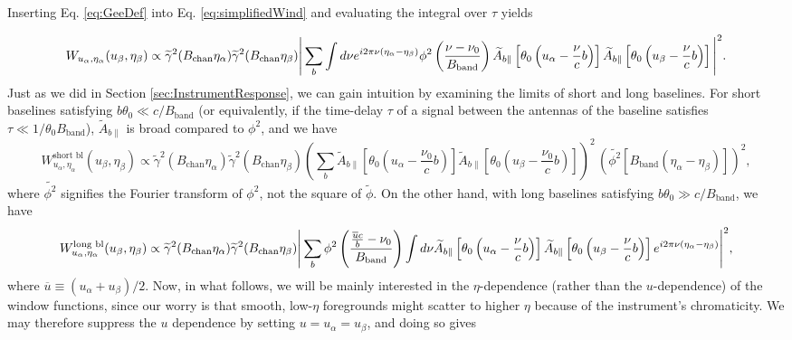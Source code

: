 \documentclass[twocolumn,aps,prd,nofootinbib,showpacs]{revtex4-1}
\begin{document}
Inserting  Eq. \eqref{eq:GeeDef} into  Eq. \eqref{eq:simplifiedWind} and evaluating the integral over $\tau$ yields
\begin{widetext}
\begin{equation}
W_{u_\alpha,\eta_\alpha} (u_\beta,\eta_\beta) \propto \widetilde{\gamma}^2(B_\textrm{chan} \eta_\alpha)\widetilde{\gamma}^2(B_\textrm{chan} \eta_\beta) \Bigg{|} \sum_b \int d\nu e^{i 2 \pi \nu (\eta_\alpha - \eta_\beta)} \phi^2 \left( \frac{\nu-\nu_0}{B_\textrm{band}}\right)  \widetilde{A}_{b\parallel} \left[ \theta_0 \left( u_\alpha - \frac{\nu}{c} b \right) \right]  \widetilde{A}_{b\parallel} \left[ \theta_0 \left( u_\beta - \frac{\nu}{c} b \right) \right] \Bigg{|}^2.
\end{equation}
Just as we did in Section \ref{sec:InstrumentResponse}, we can gain intuition by examining the limits of short and long baselines.  For short baselines satisfying $b \theta_0 \ll c / B_\textrm{band}$ (or equivalently, if the time-delay $\tau$ of a signal between the antennas of the baseline satisfies $\tau \ll 1/ \theta_0 B_\textrm{band}$), $\widetilde{A}_{b\parallel}$ is broad compared to $\phi^2$, and we have
\begin{equation}
W_{u_\alpha,\eta_\alpha}^\textrm{short bl} (u_\beta,\eta_\beta) \propto \widetilde{\gamma}^2(B_\textrm{chan} \eta_\alpha)\widetilde{\gamma}^2(B_\textrm{chan} \eta_\beta) \left( \sum_b   \widetilde{A}_{b\parallel} \left[ \theta_0 \left( u_\alpha - \frac{\nu_0}{c} b \right) \right]  \widetilde{A}_{b\parallel} \left[ \theta_0 \left( u_\beta - \frac{\nu_0}{c} b \right) \right] \right)^2 \,\left(\widetilde{\phi^2} \left[B_\textrm{band} (\eta_\alpha - \eta_\beta) \right] \right)^2,
\end{equation}
where $\widetilde{\phi^2}$ signifies the Fourier transform of $\phi^2$, not the square of $\widetilde{\phi}$.  On the other hand, with long baselines satisfying $b \theta_0 \gg c / B_\textrm{band}$, we have
\begin{equation}
W_{u_\alpha,\eta_\alpha}^\textrm{long bl} (u_\beta,\eta_\beta) \propto \widetilde{\gamma}^2(B_\textrm{chan} \eta_\alpha)\widetilde{\gamma}^2(B_\textrm{chan} \eta_\beta) \Bigg{|} \sum_b \phi^2 \left( \frac{\frac{\overline{u} c}{b}-\nu_0}{B_\textrm{band}}\right) \int d\nu \widetilde{A}_{b\parallel} \left[ \theta_0 \left( u_\alpha - \frac{\nu}{c} b \right) \right]  \widetilde{A}_{b\parallel} \left[ \theta_0 \left( u_\beta - \frac{\nu}{c} b \right) \right] e^{i 2 \pi \nu (\eta_\alpha - \eta_\beta)} \Bigg{|}^2,
\end{equation}
where $\overline{u} \equiv (u_\alpha + u_\beta) / 2$.  Now, in what follows, we will be mainly interested in the $\eta$-dependence (rather than the $u$-dependence) of the window functions, since our worry is that smooth, low-$\eta$ foregrounds might scatter to higher $\eta$ because of the instrument's chromaticity.  We may therefore suppress the $u$ dependence by setting $u = u_\alpha = u_\beta$, and doing so gives

\end{widetext}
\end{document}
